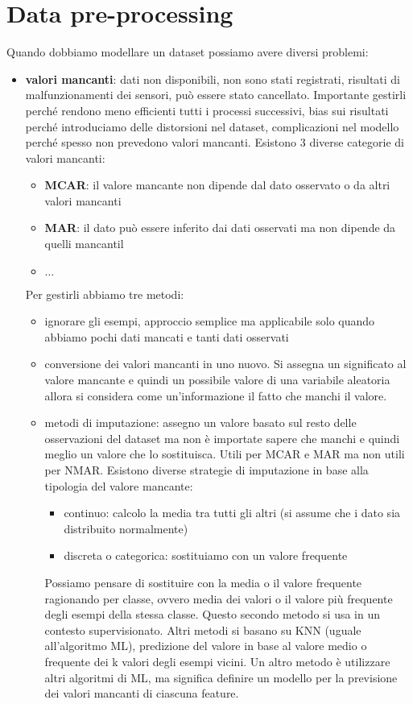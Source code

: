 \section*{Data pre-processing}
Quando dobbiamo modellare un dataset possiamo avere diversi problemi:
\begin{itemize}
    \item \textbf{valori mancanti}: dati non disponibili, non sono stati registrati,
    risultati di malfunzionamenti dei sensori, può essere stato cancellato. Importante
    gestirli perché rendono meno efficienti tutti i processi successivi, bias sui
    risultati perché introduciamo delle distorsioni nel dataset, complicazioni nel modello
    perché spesso non prevedono valori mancanti. Esistono 3 diverse categorie di valori
    mancanti:
    \begin{itemize}
        \item \textbf{MCAR}: il valore mancante non dipende dal dato osservato o
        da altri valori mancanti
        \item \textbf{MAR}: il dato può essere inferito dai dati osservati ma non dipende
        da quelli mancantil
        \item $\dots$
    \end{itemize}
    Per gestirli abbiamo tre metodi:
    \begin{itemize}
        \item ignorare gli esempi, approccio semplice ma applicabile solo quando 
        abbiamo pochi dati mancati e tanti dati osservati
        \item conversione dei valori mancanti in uno nuovo. Si assegna un significato
        al valore mancante e quindi un possibile valore di una variabile aleatoria
        allora si considera come un'informazione il fatto che manchi il valore.
        \item metodi di imputazione: assegno un valore basato sul resto delle osservazioni del dataset
        ma non è importate sapere che manchi e quindi meglio un valore che lo sostituisca. Utili per MCAR e MAR
        ma non utili per NMAR. Esistono diverse strategie di imputazione in base 
        alla tipologia del valore mancante:
        \begin{itemize}
            \item continuo: calcolo la media tra tutti gli altri (si assume che i dato sia distribuito normalmente)
            \item discreta o categorica: sostituiamo con un valore frequente
        \end{itemize}
        Possiamo pensare di sostituire con la media o il valore frequente ragionando
        per classe, ovvero media dei valori o il valore più frequente degli esempi 
        della stessa classe. Questo secondo metodo si usa in un contesto supervisionato.
        Altri metodi si basano su KNN (uguale all'algoritmo ML), predizione del 
        valore in base al valore medio o frequente dei k valori degli esempi vicini.
        Un altro metodo è utilizzare altri algoritmi di ML, ma significa 
        definire un modello per la previsione dei valori mancanti di ciascuna feature.
    \end{itemize}


\end{itemize}
